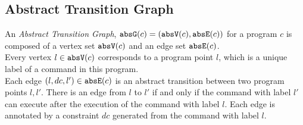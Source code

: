 \subsection{Abstract Transition Graph}
\label{sec:abs_prog}
An \emph{Abstract Transition Graph}, $\mathtt{abs}{\mathtt{G}}(c) =(\mathtt{abs}{\mathtt{V}}(c), \mathtt{abs}{\mathtt{E}}(c))$ for a program $c$ is composed of
a vertex set $\mathtt{abs}{\mathtt{V}}(c)$ and an edge set $\mathtt{abs}{\mathtt{E}}(c)$.
%
\\
Every 
vertex $l \in \mathtt{abs}{\mathtt{V}}(c)$ corresponds to a program point $l$, which is a unique
label of a command in this program.
\\
Each edge $(l, dc, l') \in \mathtt{abs}{\mathtt{E}}(c)$ is an abstract transition
between two program points $l, l'$. There is an edge from $l$ to $l'$ if and only if
the command with label $l'$ can execute after the execution of the command with label $l$.
Each edge is annotated by a constraint $dc$ generated from the command with label $l$.
